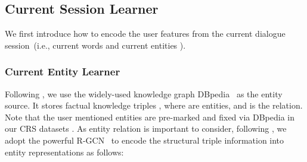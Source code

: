 \documentclass[sigconf,natbib=true]{acmart}
\begin{document}
\begin{comment}
\textls[-12]{In this section, we propose our User-Centric Conversational Recommendation approach to the CRS task, coined UCCR. Unlike existing CRS methods~\cite{chen2019towards,zhou2020improving,zhou2020towards}, which mainly focus on the user behaviors from the current dialogue session, our UCCR models comprehensive features of users from multi-aspects. Concretely, we extract the user preferences from three aspects: (1). current dialogue session, (2). historical dialogue session, (3). look-alike users.
First, in both current and historical sessions,
we introduce multi-view methods to learn user representations from word, entity and item views.
Then, to learn the intrinsic correlations among words, entities and items in both current and historical sessions, we propose a series of multi-view preference alignment tasks.
Moreover, we consider fine-grained temporal factors to select look-alike users.
Finally, the user preferences are learned by jointly considering multi-aspect and multi-view user features. The overview illustration of our model is shown in Fig~\ref{network}.}
\end{comment}

\subsection{Current Session Learner}
\label{sec.current_session}

We first introduce how to encode the user features from the current dialogue session~(i.e., current words  and current entities ).

\subsubsection{Current Entity Learner}



Following \cite{chen2019towards,zhou2020improving}, we use the widely-used knowledge graph DBpedia~\cite{lehmann2015dbpedia} as the entity source. It stores factual knowledge triples , where  are entities, and  is the relation. Note that the user mentioned entities are pre-marked and fixed via DBpedia in our CRS datasets \cite{li2018towards,zhou2020towards}.
As entity relation is important to consider, following \cite{chen2019towards,zhou2020improving}, we adopt the powerful R-GCN~\cite{schlichtkrull2018modeling} to encode the structural triple information into entity representations as follows:
\end{document}
